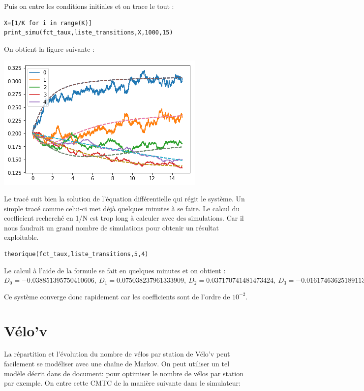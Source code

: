 \documentclass[a4paper,12pt]{report}
\def\D{\displaystyle}
\begin{document}
Puis on entre les conditions initiales et on trace le tout :

\begin{lstlisting}[frame=single]
X=[1/K for i in range(K)]
print_simu(fct_taux,liste_transitions,X,1000,15)
\end{lstlisting}

On obtient la figure suivante :

\begin{center}
  \includegraphics{bianchi.png}
\end{center}
  
Le tracé suit bien la solution de l'équation différentielle qui régit
le système. Un simple tracé comme celui-ci met déjà quelques minutes à
se faire. Le calcul du coefficient recherché en 1/N est trop long à
calculer avec des simulations. Car il nous faudrait un grand nombre de
simulations pour obtenir un résultat exploitable.

\begin{lstlisting}[frame=single]
theorique(fct_taux,liste_transitions,5,4)
\end{lstlisting}

Le calcul à l'aide de la formule se fait en quelques minutes et on
obtient :  $\D  D_0=-0.038851395750410606,\ D_1= 0.075038237961333909,\
  D_2=0.037170741481473424,\ D_3= -0.016174636251891139 $ 

Ce système converge donc rapidement car les coefficients sont de
l'ordre de $\D 10^{-2}$.

\section{Vélo'v}
La répartition et l'évolution du nombre de vélos par station de Vélo'v
peut facilement se modéliser avec une chaîne de Markov. On peut utiliser
un tel modèle décrit dans de document: \cite{velov} pour optimiser le nombre de vélos par station par
exemple.
On entre cette CMTC de la manière suivante dans le simulateur:
\end{document}
